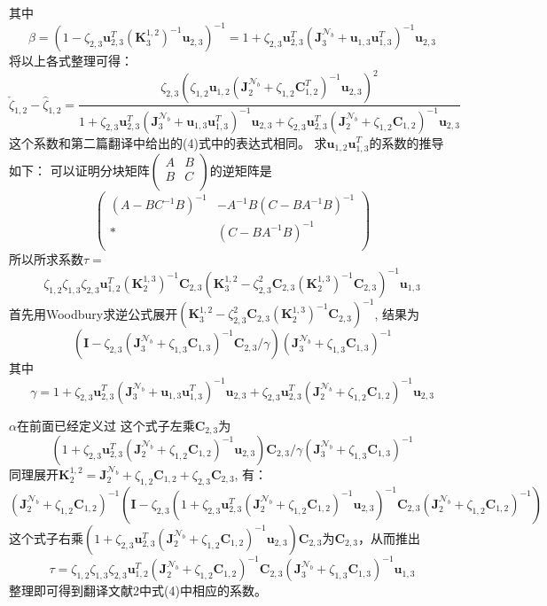 \documentclass[12pt]{article}
\theoremstyle{remark}
\begin{document}
其中
\[
\beta=(1-\zeta_{2,3}\bm{u}_{2,3}^T(\bm{K}_3^{1,2})^{-1}\bm{u}_{2,3})^{-1}=1+\zeta_{2,3}\bm{u}_{2,3}^T(\bm{J}_3^{\mathcal{N}_b}+\bm{u}_{1,3}\bm{u}_{1,3}^T)^{-1}\bm{u}_{2,3}
\]
将以上各式整理可得：
\begin{equation}
\check{\zeta}_{1,2}-\hat{\zeta}_{1,2}=
\frac{\zeta_{2,3}(\zeta_{1,2}\bm{u}_{1,2}(\bm{J}_2^{\mathcal{N}_b}+\zeta_{1,2}\bm{C}_{1,2}^T)^{-1}\bm{u}_{2,3})^2}{1+\zeta_{2,3}\bm{u}_{2,3}^T(\bm{J}_3^{\mathcal{N}_b}+\bm{u}_{1,3}\bm{u}_{1,3}^T)^{-1}\bm{u}_{2,3}+\zeta_{2,3}\bm{u}_{2,3}^T(\bm{J}_2^{\mathcal{N}_b}+\zeta_{1,2}\bm{C}_{1,2})^{-1}\bm{u}_{2,3}}
\end{equation}
这个系数和第二篇翻译中给出的(4)式中的表达式相同。
求$\bm{u}_{1,2}\bm{u}_{1,3}^T$的系数的推导如下：
可以证明分块矩阵$\left(\begin{array}{cc}
A & B\\
B & C \\
\end{array}
\right)$的逆矩阵是\[
\left(\begin{array}{cc}
(A-BC^{-1}B)^{-1} & -A^{-1}B(C-BA^{-1}B)^{-1}\\
* & (C-BA^{-1}B)^{-1} \\
\end{array}
\right)\]
所以所求系数$\tau=$
\[
\zeta_{1,2}\zeta_{1,3}\zeta_{2,3}\bm{u}_{1,2}^T(\bm{K}_2^{1,3})^{-1}\bm{C}_{2,3}(\bm{K}_3^{1,2}-\zeta_{2,3}^2\bm{C}_{2,3}(\bm{K}_2^{1,3})^{-1}\bm{C}_{2,3})^{-1}\bm{u}_{1,3}
\]
首先用Woodbury求逆公式展开$(\bm{K}_3^{1,2}-\zeta_{2,3}^2\bm{C}_{2,3}(\bm{K}_2^{1,3})^{-1}\bm{C}_{2,3})^{-1}$,
结果为
\[
(\bm{I}-\zeta_{2,3}(\bm{J}_3^{\mathcal{N}_b}+\zeta_{1,3}\bm{C}_{1,3})^{-1}\bm{C}_{2,3}/\gamma)(\bm{J}_3^{\mathcal{N}_b}+\zeta_{1,3}\bm{C}_{1,3})^{-1}
\]
其中\[
\gamma=1+\zeta_{2,3}\bm{u}_{2,3}^T(\bm{J}_3^{\mathcal{N}_b}+\bm{u}_{1,3}\bm{u}_{1,3}^T)^{-1}\bm{u}_{2,3}+\zeta_{2,3}\bm{u}_{2,3}^T(\bm{J}_2^{\mathcal{N}_b}+\zeta_{1,2}\bm{C}_{1,2})^{-1}\bm{u}_{2,3}
\]

$\alpha$在前面已经定义过
这个式子左乘$\bm{C}_{2,3}$为
\[
(1+\zeta_{2,3}\bm{u}_{2,3}^T(\bm{J}_2^{\mathcal{N}_b}+\zeta_{1,2}\bm{C}_{1,2})^{-1}\bm{u}_{2,3})\bm{C}_{2,3}/\gamma(\bm{J}_3^{\mathcal{N}_b}+\zeta_{1,3}\bm{C}_{1,3})^{-1}
\]
同理展开$\bm{K}_2^{1,2}=\bm{J}_2^{\mathcal{N}_b}+\zeta_{1,2}\bm{C}_{1,2}+\zeta_{2,3}\bm{C}_{2,3}$,
有：
\[
(\bm{J}_2^{\mathcal{N}_b}+\zeta_{1,2}\bm{C}_{1,2})^{-1}(\bm{I}-\zeta_{2,3}(1+\zeta_{2,3}\bm{u}_{2,3}^T(\bm{J}_2^{\mathcal{N}_b}+\zeta_{1,2}\bm{C}_{1,2})^{-1}\bm{u}_{2,3})^{-1}\bm{C}_{2,3}(\bm{J}_2^{\mathcal{N}_b}+\zeta_{1,2}\bm{C}_{1,2})^{-1})
\]
这个式子右乘$(1+\zeta_{2,3}\bm{u}_{2,3}^T(\bm{J}_2^{\mathcal{N}_b}+\zeta_{1,2}\bm{C}_{1,2})^{-1}\bm{u}_{2,3})\bm{C}_{2,3}$为$\bm{C}_{2,3}$，从而推出
\[
\tau=\zeta_{1,2}\zeta_{1,3}\zeta_{2,3}\bm{u}_{1,2}^T(\bm{J}_2^{\mathcal{N}_b}+\zeta_{1,2}\bm{C}_{1,2})^{-1}\bm{C}_{2,3}(\bm{J}_3^{\mathcal{N}_b}+\zeta_{1,3}\bm{C}_{1,3})^{-1}\bm{u}_{1,3}
\]
整理即可得到翻译文献2中式(4)中相应的系数。
\end{document}

